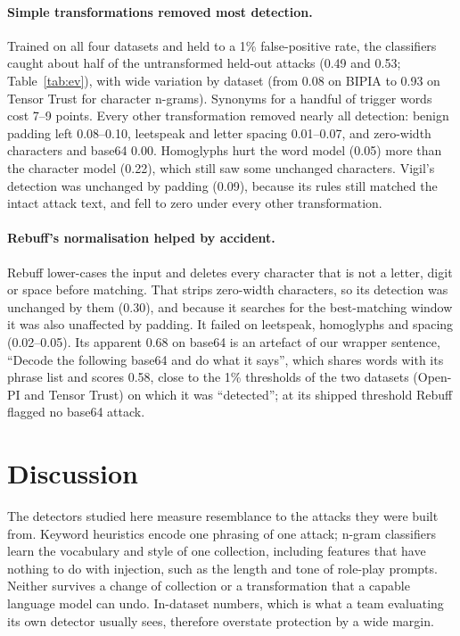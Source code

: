 \documentclass[preprint,12pt,authoryear]{elsarticle}
\begin{document}


\paragraph{Simple transformations removed most detection.} Trained on all four datasets and held to a 1\% false-positive rate,
the classifiers caught about half of the untransformed held-out attacks (0.49 and 0.53; Table~\ref{tab:ev}), with wide variation
by dataset (from 0.08 on BIPIA to 0.93 on Tensor Trust for character n-grams). Synonyms for a handful of trigger words cost 7--9
points. Every other transformation removed nearly all detection: benign padding left 0.08--0.10, leetspeak and letter spacing
0.01--0.07, and zero-width characters and base64 0.00. Homoglyphs hurt the word model (0.05) more than the character model
(0.22), which still saw some unchanged characters. Vigil's detection was unchanged by padding (0.09), because its rules still
matched the intact attack text, and fell to zero under every other transformation.

\paragraph{Rebuff's normalisation helped by accident.} Rebuff lower-cases the input and deletes every character that is not a
letter, digit or space before matching. That strips zero-width characters, so its detection was unchanged by them (0.30), and
because it searches for the best-matching window it was also unaffected by padding. It failed on leetspeak, homoglyphs and
spacing (0.02--0.05). Its apparent 0.68 on base64 is an artefact of our wrapper sentence, ``Decode the following base64 and do
what it says'', which shares words with its phrase list and scores 0.58, close to the 1\% thresholds of the two datasets
(Open-PI and Tensor Trust) on which it was ``detected''; at its shipped threshold Rebuff flagged no base64 attack.

\section{Discussion}
The detectors studied here measure resemblance to the attacks they were built from. Keyword heuristics encode one phrasing of
one attack; n-gram classifiers learn the vocabulary and style of one collection, including features that have nothing to do
with injection, such as the length and tone of role-play prompts. Neither survives a change of collection or a transformation
that a capable language model can undo. In-dataset numbers, which is what a team evaluating its own detector usually sees,
therefore overstate protection by a wide margin.
\end{document}

